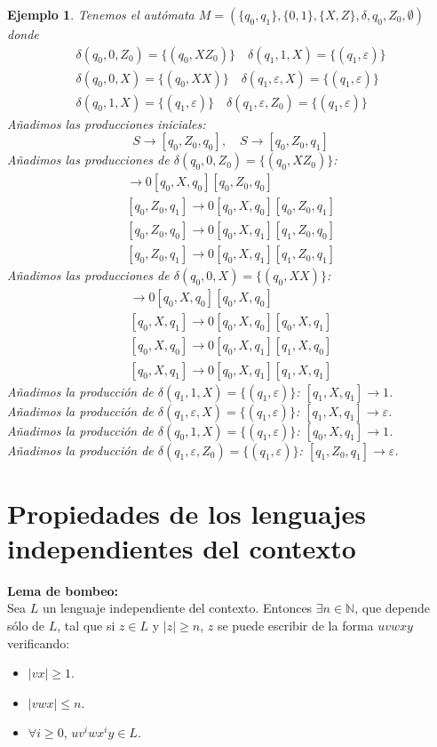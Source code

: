 \documentclass[11pt,titlepage,a4paper]{article}
\theoremstyle{ejemplo}
\newtheorem*{eje}{Ejemplo} %
\theoremstyle{algoritmo}
\begin{document}
\begin{eje}
Tenemos el autómata $M=(\{q_0,q_1\},\{0,1\},\{X,Z\},\delta,q_0,Z_0,\emptyset)$
donde
\begin{gather*}
\delta(q_0,0,Z_0)=\{(q_0,XZ_0)\}\quad\delta(q_1,1,X)=\{(q_1,\varepsilon)\}\\
%
\delta(q_0,0,X)=\{(q_0,XX)\}\quad\delta(q_1,\varepsilon,X)=\{(q_1,\varepsilon)\}
\\
%
\delta(q_0,1,X)=\{(q_1,\varepsilon)\}\quad\delta(q_1,\varepsilon,Z_0)=
\{(q_1,\varepsilon)\}
\end{gather*}
Añadimos las producciones iniciales:
$$S\to[q_0,Z_0,q_0],\quad S\to[q_0,Z_0,q_1]$$
Añadimos las producciones de $\delta(q_0,0,Z_0)=\{(q_0,XZ_0)\}$:
\begin{gather*}
[q_0,Z_0,q_0]\to 0[q_0,X,q_0][q_0,Z_0,q_0] \\
%
[q_0,Z_0,q_1]\to 0[q_0,X,q_0][q_0,Z_0,q_1] \\
%
[q_0,Z_0,q_0]\to 0[q_0,X,q_1][q_1,Z_0,q_0] \\
%
[q_0,Z_0,q_1]\to 0[q_0,X,q_1][q_1,Z_0,q_1]
\end{gather*}
Añadimos las producciones de $\delta(q_0,0,X)=\{(q_0,XX)\}$:
\begin{gather*}
[q_0,X,q_0]\to 0[q_0,X,q_0][q_0,X,q_0] \\
%
[q_0,X,q_1]\to 0[q_0,X,q_0][q_0,X,q_1] \\
%
[q_0,X,q_0]\to 0[q_0,X,q_1][q_1,X,q_0] \\
%
[q_0,X,q_1]\to 0[q_0,X,q_1][q_1,X,q_1]
\end{gather*}
Añadimos la producción de $\delta(q_1,1,X)=\{(q_1,\varepsilon)\}$: $[q_1,X,q_1]
\to 1$.\\
Añadimos la producción de $\delta(q_1,\varepsilon,X)=\{(q_1,\varepsilon)\}$: 
$[q_1,X,q_1]\to\varepsilon$.\\
Añadimos la producción de $\delta(q_0,1,X)=\{(q_1,\varepsilon)\}$: $[q_0,X,q_1]
\to 1$.\\
Añadimos la producción de $\delta(q_1,\varepsilon,Z_0)=\{(q_1,\varepsilon)\}$: 
$[q_1,Z_0,q_1]\to\varepsilon$.
\end{eje}

\newpage
\section{Propiedades de los lenguajes independientes del contexto}

\textbf{Lema de bombeo:}
\\
Sea $L$ un lenguaje independiente del contexto. Entonces $\exists n\in\mathbb{N}
$, que depende sólo de $L$, tal que si $z\in L$ y $|z|\geq n$, $z$ se puede
escribir de la forma $uvwxy$ verificando:
\begin{itemize}[noitemsep]
	\item $|vx|\geq 1$.
	\item $|vwx|\leq n$.
	\item $\forall i\geq 0$, $uv^iwx^iy\in L$.
\end{itemize}
\end{document}
